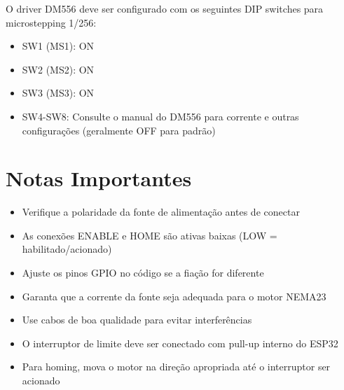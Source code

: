 \documentclass{article}
\begin{document}
O driver DM556 deve ser configurado com os seguintes DIP switches para microstepping 1/256:

\begin{itemize}
\item SW1 (MS1): ON
\item SW2 (MS2): ON
\item SW3 (MS3): ON
\item SW4-SW8: Consulte o manual do DM556 para corrente e outras configurações (geralmente OFF para padrão)
\end{itemize}

\section{Notas Importantes}

\begin{itemize}
\item Verifique a polaridade da fonte de alimentação antes de conectar
\item As conexões ENABLE e HOME são ativas baixas (LOW = habilitado/acionado)
\item Ajuste os pinos GPIO no código se a fiação for diferente
\item Garanta que a corrente da fonte seja adequada para o motor NEMA23
\item Use cabos de boa qualidade para evitar interferências
\item O interruptor de limite deve ser conectado com pull-up interno do ESP32
\item Para homing, mova o motor na direção apropriada até o interruptor ser acionado
\end{itemize}
\end{document}
